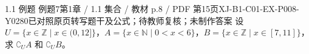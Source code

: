 \par\noindent\begin{minipage}{\linewidth}
\begin{bankitem}{1.1 例题 例题7}{第1章 / 1.1 集合 / 教材 p.8 / PDF 第15页}{XJ-B1-C01-EX-P008-Y0280}{已对照原页转写题干及公式；待教师复核；未制作答案}
设 $U=\{x\in\mathbb Z\mid x\in(0,12]\}$，$A=\{x\in\mathbb N\mid0<x<6\}$，$B=\{x\in\mathbb Z\mid x\in[7,11]\}$，求 $\complement_U A$ 和 $\complement_U B$。
\end{bankitem}
\end{minipage}\par\medskip
